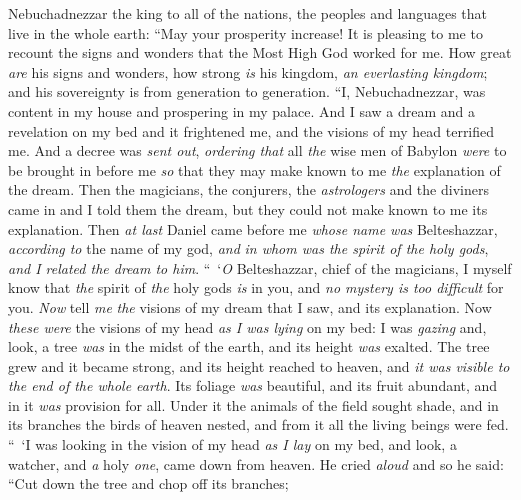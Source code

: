 \begin{biblechapter} %
  Nebuchadnezzar the king to all of the nations, the peoples and languages that live in the whole earth: “May your prosperity increase!
\verse It is pleasing to me to recount the signs and wonders that the Most High God worked for me.
\verse How great \textit{are} his signs and wonders, how strong \textit{is} his kingdom, \textit{an everlasting kingdom}; and his sovereignty is from generation to generation.
 “I, Nebuchadnezzar, was content in my house and prospering in my palace.
\verse And I saw a dream and a revelation on my bed and it frightened me, and the visions of my head terrified me.
\verse And a decree was \textit{sent out}, \textit{ordering that} all \textit{the} wise men of Babylon \textit{were} to be brought in before me \textit{so} that they may make known to me \textit{the} explanation of the dream.
\verse Then the magicians, the conjurers, the \textit{astrologers} and the diviners came in and I told them the dream, but they could not make known to me its explanation.
\verse Then \textit{at last} Daniel came before me \textit{whose name was} Belteshazzar, \textit{according to} the name of my god, \textit{and} \textit{in whom was the spirit of the holy gods}, \textit{and I related the dream to him}.
\verse “ ‘\textit{O} Belteshazzar, chief of the magicians, I myself know that \textit{the} spirit of \textit{the} holy gods \textit{is} in you, and \textit{no mystery is too difficult} for you. \textit{Now} tell \textit{me} \textit{the} visions of my dream that I saw, and its explanation.
\verse Now \textit{these were} the visions of my head \textit{as I was lying} on my bed: I was \textit{gazing} and, look, a tree \textit{was} in the midst of the earth, and its height \textit{was} exalted.
\verse The tree grew and it became strong, 
and its height reached to heaven, 
and \textit{it was visible to the end of the whole earth}.
\verse Its foliage \textit{was} beautiful, 
and its fruit abundant, 
and in it \textit{was} provision for all. 
Under it the animals of the field sought shade, 
and in its branches the birds of heaven nested, 
and from it all the living beings were fed.
\verse “ ‘I was looking in the vision of my head \textit{as I lay} on my bed, and look, a watcher, and \textit{a} holy \textit{one}, came down from heaven.
\verse He cried \textit{aloud} and so he said:
\verse “Cut down the tree and chop off its branches; 

\end{biblechapter}
